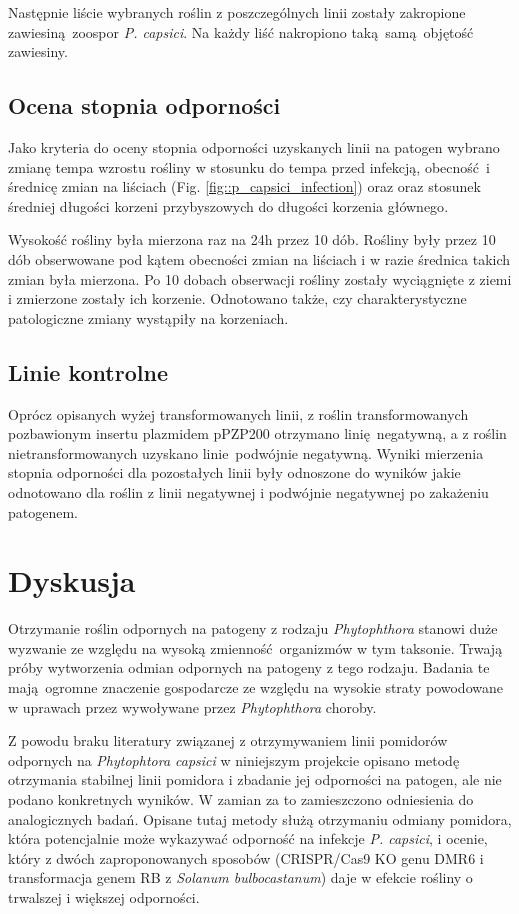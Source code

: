 \documentclass[two column, twoside, a4paper]{article}
\begin{document}
Następnie liście wybranych roślin z poszczególnych linii zostały zakropione zawiesiną zoospor \textit{P. capsici}. Na każdy liść nakropiono taką samą objętość zawiesiny.

\subsection{Ocena stopnia odporności}

Jako kryteria do oceny stopnia odporności uzyskanych linii na patogen wybrano zmianę tempa wzrostu rośliny w stosunku do tempa przed infekcją, obecność i średnicę zmian na liściach (Fig. \ref{fig::p_capsici_infection}) oraz oraz stosunek średniej długości korzeni przybyszowych do długości korzenia głównego\autocite{Lamour2012}.

Wysokość rośliny była mierzona raz na 24h przez 10 dób. Rośliny były przez 10 dób obserwowane pod kątem obecności zmian na liściach i w razie średnica takich zmian była mierzona. Po 10 dobach obserwacji rośliny zostały wyciągnięte z ziemi i zmierzone zostały ich korzenie. Odnotowano także, czy charakterystyczne patologiczne zmiany wystąpiły na korzeniach.

\subsection{Linie kontrolne}

Oprócz opisanych wyżej transformowanych linii, z roślin transformowanych pozbawionym insertu plazmidem pPZP200 otrzymano linię negatywną, a z roślin nietransformowanych uzyskano linie podwójnie negatywną. Wyniki mierzenia stopnia odporności dla pozostałych linii były odnoszone do wyników jakie odnotowano dla roślin z linii negatywnej i podwójnie negatywnej po zakażeniu patogenem.

\section{Dyskusja}

Otrzymanie roślin odpornych na patogeny z rodzaju \textit{Phytophthora} stanowi duże wyzwanie ze względu na wysoką zmienność organizmów w tym taksonie. Trwają próby wytworzenia odmian odpornych na patogeny z tego rodzaju. Badania te mają ogromne znaczenie gospodarcze ze względu na wysokie straty powodowane w uprawach przez wywoływane przez \textit{Phytophthora} choroby\autocite{Lamour2012, Barchenger2018, Sy2005, Chen2019, Song2003, Bagga2019}.

Z powodu braku literatury związanej z otrzymywaniem linii pomidorów odpornych na \textit{Phytophtora capsici} w niniejszym projekcie opisano metodę otrzymania stabilnej linii pomidora i zbadanie jej odporności na patogen, ale nie podano konkretnych wyników. W zamian za to zamieszczono odniesienia do analogicznych badań. Opisane tutaj metody służą otrzymaniu odmiany pomidora, która potencjalnie może wykazywać odporność na infekcje \textit{P. capsici}, i ocenie, który z dwóch zaproponowanych sposobów (CRISPR/Cas9 KO genu DMR6 i transformacja genem RB z \textit{Solanum bulbocastanum}) daje w efekcie rośliny o trwalszej i większej odporności.
\end{document}
